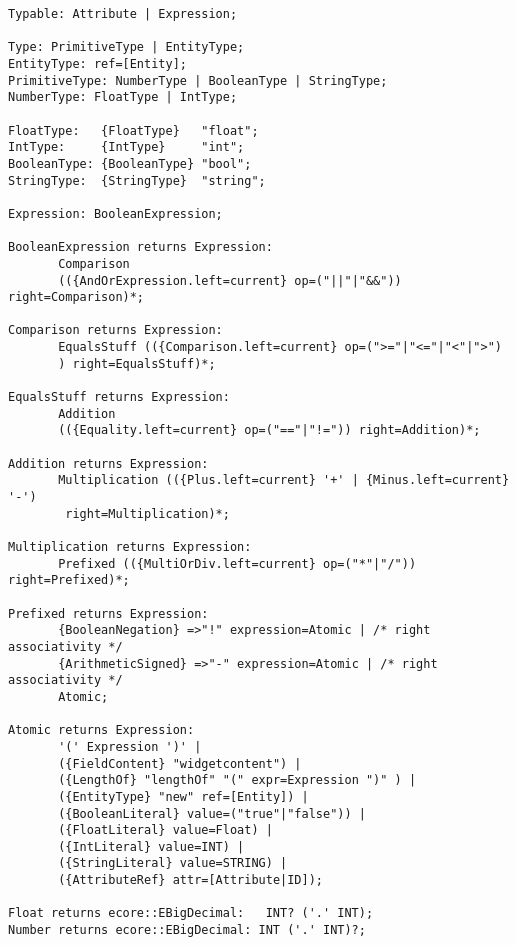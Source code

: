 \begin{lstlisting}[language=xtext,float,label=lst:grammar-plain-types-and-ex,caption=Types
and Expressions.] 
Typable: Attribute | Expression;

Type: PrimitiveType | EntityType;
EntityType: ref=[Entity];
PrimitiveType: NumberType | BooleanType | StringType;
NumberType: FloatType | IntType;

FloatType:   {FloatType}   "float";
IntType:     {IntType}     "int";
BooleanType: {BooleanType} "bool";
StringType:	 {StringType}  "string";

Expression: BooleanExpression;

BooleanExpression returns Expression:
       Comparison
       (({AndOrExpression.left=current} op=("||"|"&&")) right=Comparison)*;

Comparison returns Expression:
       EqualsStuff (({Comparison.left=current} op=(">="|"<="|"<"|">")
       ) right=EqualsStuff)*;

EqualsStuff returns Expression:
       Addition 
       (({Equality.left=current} op=("=="|"!=")) right=Addition)*;

Addition returns Expression:
       Multiplication (({Plus.left=current} '+' | {Minus.left=current} '-') 
        right=Multiplication)*;

Multiplication returns Expression:
       Prefixed (({MultiOrDiv.left=current} op=("*"|"/")) right=Prefixed)*;

Prefixed returns Expression:
       {BooleanNegation} =>"!" expression=Atomic | /* right associativity */
       {ArithmeticSigned} =>"-" expression=Atomic | /* right associativity */
       Atomic;

Atomic returns Expression:
       '(' Expression ')' |
       ({FieldContent} "widgetcontent") |
       ({LengthOf} "lengthOf" "(" expr=Expression ")" ) |
       ({EntityType} "new" ref=[Entity]) | 
       ({BooleanLiteral} value=("true"|"false")) |
       ({FloatLiteral} value=Float) |
       ({IntLiteral} value=INT) |
       ({StringLiteral} value=STRING) |
       ({AttributeRef} attr=[Attribute|ID]);

Float returns ecore::EBigDecimal:   INT? ('.' INT);
Number returns ecore::EBigDecimal: INT ('.' INT)?;
\end{lstlisting}

%


